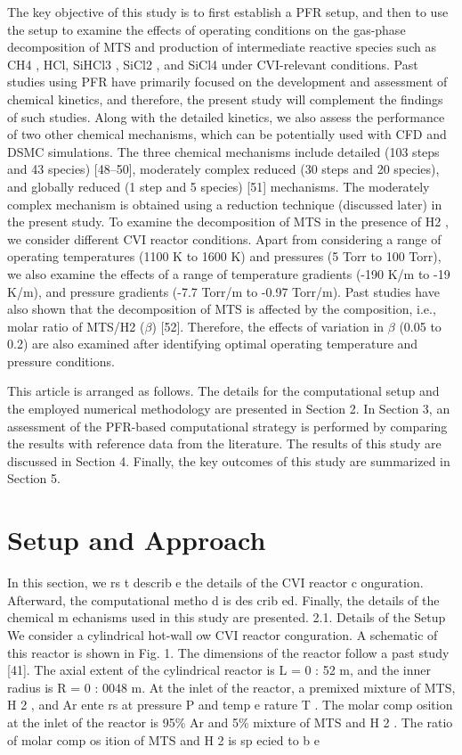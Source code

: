 \documentclass[10pt, letterpaper]{article}
\begin{document}
The key objective of this study is to first establish a PFR setup, and then to use the setup to examine
the effects of operating conditions on the gas-phase decomposition of MTS and production of intermediate
reactive species such as CH4 , HCl, SiHCl3 , SiCl2 , and SiCl4 under CVI-relevant conditions. Past studies
using PFR have primarily focused on the development and assessment of chemical kinetics, and therefore,
the present study will complement the findings of such studies. Along with the detailed kinetics, we also
assess the performance of two other chemical mechanisms, which can be potentially used with CFD and
DSMC simulations. The three chemical mechanisms include detailed (103 steps and 43 species) [48–50],
moderately complex reduced (30 steps and 20 species), and globally reduced (1 step and 5 species) [51]
mechanisms. The moderately complex mechanism is obtained using a reduction technique (discussed later)
in the present study. To examine the decomposition of MTS in the presence of H2 , we consider different
CVI reactor conditions. Apart from considering a range of operating temperatures (1100 K to 1600 K) and
pressures (5 Torr to 100 Torr), we also examine the effects of a range of temperature gradients (-190 K/m
to -19 K/m), and pressure gradients (-7.7 Torr/m to -0.97 Torr/m). Past studies have also shown that the
decomposition of MTS is affected by the composition, i.e., molar ratio of MTS/H2 ($\beta$) [52]. Therefore, the
effects of variation in $\beta$ (0.05 to 0.2) are also examined after identifying optimal operating temperature and
pressure conditions.

This article is arranged as follows. The details for the computational setup and the employed numerical
methodology are presented in Section 2. In Section 3, an assessment of the PFR-based computational
strategy is performed by comparing the results with reference data from the literature. The results of this
study are discussed in Section 4. Finally, the key outcomes of this study are summarized in Section 5.
\section{Setup and Approach}
In this section, we rs t describ e the details of the CVI reactor c onguration. Afterward, the computational
metho d is des crib ed. Finally, the details of the chemical m echanisms used in this study are presented.
2.1. Details of the Setup
We consider a cylindrical hot-wall 
ow CVI reactor conguration. A schematic of this reactor is shown in
Fig. 1. The dimensions of the reactor follow a past study [41]. The axial extent of the cylindrical reactor is
L
= 0
:
52 m, and the inner radius is
R
= 0
:
0048 m. At the inlet of the reactor, a premixed mixture of MTS,
H
2
, and Ar ente rs at pressure
P
and temp e rature
T
. The molar comp osition at the inlet of the reactor is
95\% Ar and 5\% mixture of MTS and H
2
. The ratio of molar comp os ition of MTS and H
2
is sp ecied to b e
\end{document}
